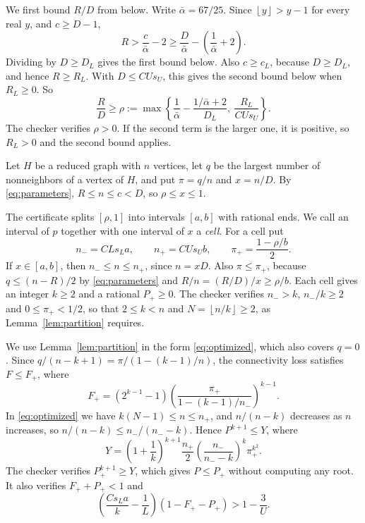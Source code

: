 \documentclass[11pt]{article}
\newcommand{\floor}[1]{\left\lfloor#1\right\rfloor}
\begin{document}
We first bound $R/D$ from below. Write $\bar\alpha=67/25$. Since
$\floor{y}>y-1$ for every real $y$, and $c\ge D-1$,
\begin{equation*}
 R>\frac{c}{\bar\alpha}-2\ge\frac D{\bar\alpha}-\left(\frac1{\bar\alpha}+2\right).
\end{equation*}
Dividing by $D\ge D_L$ gives the first bound below. Also $c\ge c_L$, because
$D\ge D_L$, and hence $R\ge R_L$. With $D\le CUs_U$, this gives the second
bound below when $R_L\ge0$. So
\begin{equation*}
 \frac RD\ge\rho:=\max\left\{
 \frac1{\bar\alpha}-\frac{1/\bar\alpha+2}{D_L},\
 \frac{R_L}{CUs_U}\right\}.
\end{equation*}
The checker verifies $\rho>0$. If the second term is the larger one, it is
positive, so $R_L>0$ and the second bound applies.

Let $H$ be a reduced graph with $n$ vertices, let $q$ be the largest number of
nonneighbors of a vertex of $H$, and put $\pi=q/n$ and $x=n/D$. By
\eqref{eq:parameters}, $R\le n\le c<D$, so $\rho\le x\le1$.

The certificate splits $[\rho,1]$ into intervals $[a,b]$ with rational ends.
We call an interval of $p$ together with one interval of $x$ a \emph{cell}.
For a cell put
\begin{equation*}
 n_-=CLs_La,\qquad n_+=CUs_Ub,\qquad
 \pi_+=\frac{1-\rho/b}{2}.
\end{equation*}
If $x\in[a,b]$, then $n_-\le n\le n_+$, since $n=xD$. Also $\pi\le\pi_+$,
because $q\le(n-R)/2$ by \eqref{eq:parameters} and
$R/n=(R/D)/x\ge\rho/b$. Each cell gives an integer $k\ge2$ and a rational
$P_+\ge0$. The checker verifies $n_->k$, $n_-/k\ge2$ and $0\le\pi_+<1/2$, so
that $2\le k<n$ and $N=\floor{n/k}\ge2$, as Lemma~\ref{lem:partition}
requires.

We use Lemma~\ref{lem:partition} in the form \eqref{eq:optimized}, which
also covers $q=0$. Since $q/(n-k+1)=\pi/(1-(k-1)/n)$, the connectivity loss
satisfies $F\le F_+$, where
\begin{equation*}
 F_+=(2^{k-1}-1)
 \left(\frac{\pi_+}{1-(k-1)/n_-}\right)^{k-1}.
\end{equation*}
In \eqref{eq:optimized} we have $k(N-1)\le n\le n_+$, and $n/(n-k)$ decreases
as $n$ increases, so $n/(n-k)\le n_-/(n_--k)$. Hence $P^{k+1}\le Y$, where
\begin{equation*}
 Y=\left(1+\frac1k\right)^{k+1}\frac{n_+}{2}
 \left(\frac{n_-}{n_--k}\right)^k\pi_+^{k^2}.
\end{equation*}
The checker verifies $P_+^{k+1}\ge Y$, which gives $P\le P_+$ without
computing any root. It also verifies $F_++P_+<1$ and
\begin{equation}\label{eq:celltest}
 \left(\frac{Cs_La}{k}-\frac1L\right)(1-F_+-P_+)
 >1-\frac3U.
\end{equation}
\end{document}
